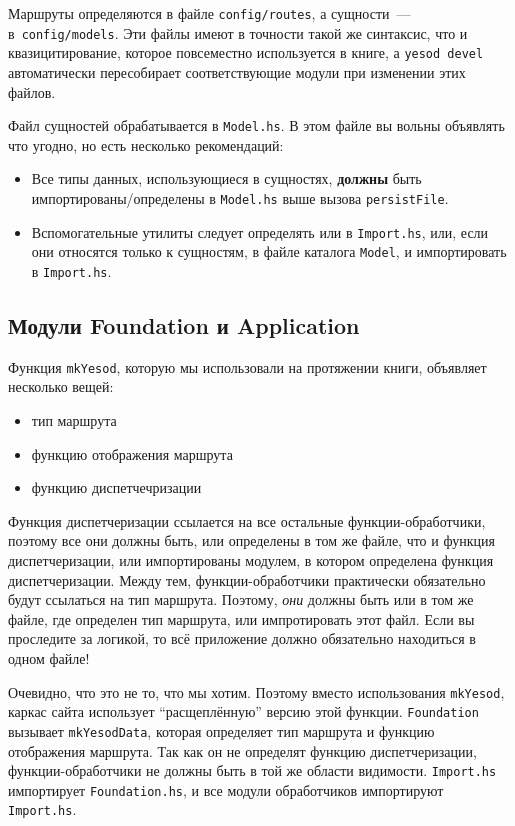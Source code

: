 Маршруты определяются в файле \texttt{config/routes}, а сущности~---
в~\texttt{config/models}.  Эти файлы имеют в точности такой же синтаксис, что и
квазицитирование, которое повсеместно используется в книге, а \texttt{yesod
devel} автоматически пересобирает соответствующие модули при изменении этих
файлов.

Файл сущностей обрабатывается в \texttt{Model.hs}. В этом файле вы вольны
объявлять что угодно, но есть несколько рекомендаций:
\begin{itemize}
    \item Все типы данных, использующиеся в сущностях, \textbf{должны} быть
        импортированы/определены в \texttt{Model.hs} выше вызова
        \lstinline!persistFile!.
    \item Вспомогательные утилиты следует определять или в \texttt{Import.hs},
        или, если они относятся только к сущностям, в файле каталога
        \texttt{Model}, и импортировать в \texttt{Import.hs}.
\end{itemize}

\subsection{Модули Foundation и Application}

Функция \lstinline!mkYesod!, которую мы использовали на протяжении книги, объявляет несколько вещей:

\begin{itemize}
  \item тип маршрута
  \item функцию отображения маршрута
  \item функцию диспетчечризации
\end{itemize}

Функция диспетчеризации ссылается на все остальные функции-обработчики, поэтому все они должны быть,
или определены в том же файле, что и функция диспетчеризации, или импортированы модулем,
в котором определена функция диспетчеризации.
Между тем, функции-обработчики практически обязательно будут ссылаться на тип маршрута. Поэтому,
\emph{они} должны быть или в том же файле, где определен тип маршрута, или импротировать этот файл.
Если вы проследите за логикой, то всё приложение должно обязательно находиться в одном файле!

Очевидно, что это не то, что мы хотим. Поэтому вместо использования \lstinline!mkYesod!, каркас
сайта использует ``расщеплённую'' версию этой функции. \lstinline!Foundation! вызывает \lstinline!mkYesodData!,
которая определяет тип маршрута и функцию отображения маршрута. Так как он не определят функцию диспетчеризации,
функции-обработчики не должны быть в той же области видимости. \lstinline!Import.hs! импортирует
\lstinline!Foundation.hs!, и все модули обработчиков импортируют \lstinline!Import.hs!.


